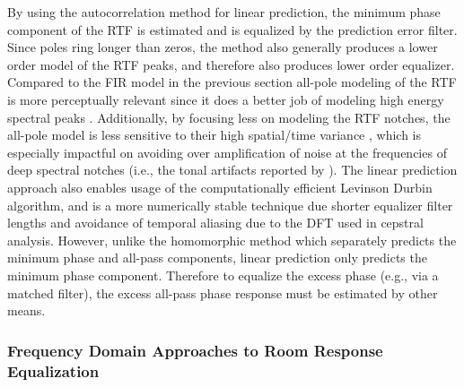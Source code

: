 By using the autocorrelation method for linear prediction, the minimum phase component of the RTF is estimated and is equalized by the prediction error filter. Since poles ring longer than zeros, the method also generally produces a lower order model of the RTF peaks, and therefore also produces lower order equalizer. Compared to the FIR model in the previous section all-pole modeling of the RTF is more perceptually relevant since it does a better job of modeling high energy spectral peaks \citep{toole1988modification}. Additionally, by focusing less on modeling the RTF notches, the all-pole model is less sensitive to their high spatial/time variance  \citep{mourjopoulos1985variation}, which is especially impactful on avoiding over amplification of noise at the frequencies of deep spectral notches (i.e., the tonal artifacts reported by \cite{neely1979invertibility}). The linear prediction approach also enables usage of the computationally efficient Levinson Durbin algorithm, and is a more numerically stable technique due shorter equalizer filter lengths and avoidance of temporal aliasing due to the DFT used in cepstral analysis. However, unlike the homomorphic method which separately predicts the minimum phase and all-pass components, linear prediction only predicts the minimum phase component. Therefore to equalize the excess phase (e.g., via a matched filter), the excess all-pass phase response must be estimated by other means. 

\subsubsection{Frequency Domain Approaches to Room Response Equalization}

